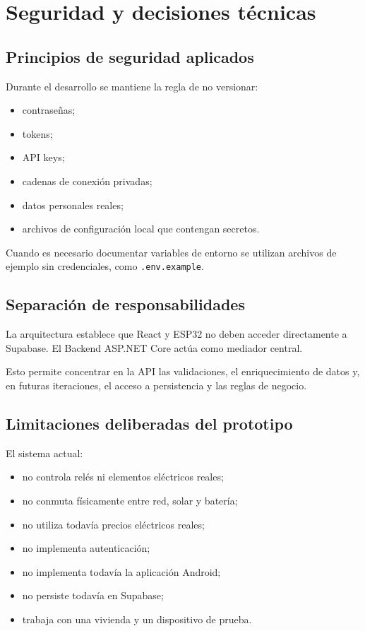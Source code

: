 \documentclass[11pt,a4paper,oneside]{report}
\begin{document}

\chapter{Seguridad y decisiones técnicas}

\section{Principios de seguridad aplicados}

Durante el desarrollo se mantiene la regla de no versionar:

\begin{itemize}
\item contraseñas;
\item tokens;
\item API keys;
\item cadenas de conexión privadas;
\item datos personales reales;
\item archivos de configuración local que contengan secretos.
\end{itemize}

Cuando es necesario documentar variables de entorno se utilizan archivos de ejemplo sin credenciales, como \texttt{.env.example}.

\section{Separación de responsabilidades}

La arquitectura establece que React y ESP32 no deben acceder directamente a Supabase. El Backend ASP.NET Core actúa como mediador central.

Esto permite concentrar en la API las validaciones, el enriquecimiento de datos y, en futuras iteraciones, el acceso a persistencia y las reglas de negocio.

\section{Limitaciones deliberadas del prototipo}

El sistema actual:

\begin{itemize}
\item no controla relés ni elementos eléctricos reales;
\item no conmuta físicamente entre red, solar y batería;
\item no utiliza todavía precios eléctricos reales;
\item no implementa autenticación;
\item no implementa todavía la aplicación Android;
\item no persiste todavía en Supabase;
\item trabaja con una vivienda y un dispositivo de prueba.
\end{itemize}
\end{document}
